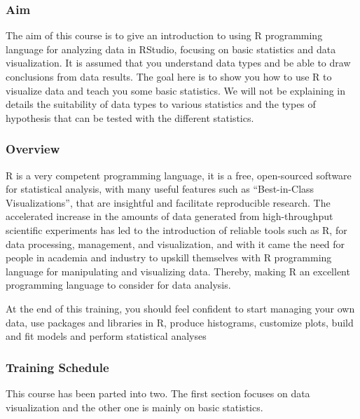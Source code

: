 \documentclass[
]{article}
\author{}
\date{\vspace{-2.5em}}
\begin{document}
{
\setcounter{tocdepth}{2}
\tableofcontents
}

\hypertarget{aim}{%
\subsubsection{Aim}\label{aim}}

The aim of this course is to give an introduction to using R programming
language for analyzing data in RStudio, focusing on basic statistics and
data visualization. It is assumed that you understand data types and be
able to draw conclusions from data results. The goal here is to show you
how to use R to visualize data and teach you some basic statistics. We
will not be explaining in details the suitability of data types to
various statistics and the types of hypothesis that can be tested with
the different statistics.

\hypertarget{overview}{%
\subsubsection{Overview}\label{overview}}

R is a very competent programming language, it is a free, open-sourced
software for statistical analysis, with many useful features such as
``Best-in-Class Visualizations'', that are insightful and facilitate
reproducible research. The accelerated increase in the amounts of data
generated from high-throughput scientific experiments has led to the
introduction of reliable tools such as R, for data processing,
management, and visualization, and with it came the need for people in
academia and industry to upskill themselves with R programming language
for manipulating and visualizing data. Thereby, making R an excellent
programming language to consider for data analysis.

At the end of this training, you should feel confident to start managing
your own data, use packages and libraries in R, produce histograms,
customize plots, build and fit models and perform statistical analyses

\hypertarget{training-schedule}{%
\subsubsection{Training Schedule}\label{training-schedule}}

This course has been parted into two. The first section focuses on data
visualization and the other one is mainly on basic statistics.
\end{document}
